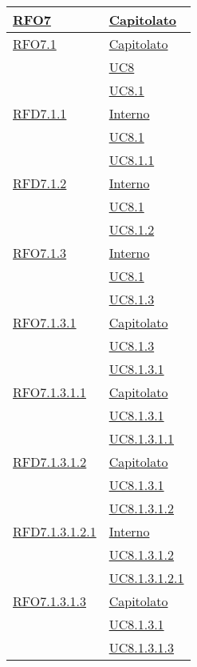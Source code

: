 \begin{longtable}{|>{\centering}m{5cm}|m{5cm}<{\centering}|}
\hyperlink{RFO7}{RFO7} & \hyperlink{Capitolato}{Capitolato}\\ \hline

\hyperlink{RFO7.1}{RFO7.1} & \hyperlink{Capitolato}{Capitolato}\\
& \hyperref[UC8]{UC8}\\
& \hyperref[UC8.1]{UC8.1}\\ \hline

\hyperlink{RFD7.1.1}{RFD7.1.1} & \hyperlink{Interno}{Interno}\\
& \hyperref[UC8.1]{UC8.1}\\
& \hyperref[UC8.1.1]{UC8.1.1}\\ \hline

\hyperlink{RFD7.1.2}{RFD7.1.2} & \hyperlink{Interno}{Interno}\\
& \hyperref[UC8.1]{UC8.1}\\
& \hyperref[UC8.1.2]{UC8.1.2}\\ \hline

\hyperlink{RFO7.1.3}{RFO7.1.3} & \hyperlink{Interno}{Interno}\\
& \hyperref[UC8.1]{UC8.1}\\
& \hyperref[UC8.1.3]{UC8.1.3}\\ \hline

\hyperlink{RFO7.1.3.1}{RFO7.1.3.1} & \hyperlink{Capitolato}{Capitolato}\\
& \hyperref[UC8.1.3]{UC8.1.3}\\
& \hyperref[UC8.1.3.1]{UC8.1.3.1}\\ \hline

\hyperlink{RFO7.1.3.1.1}{RFO7.1.3.1.1} & \hyperlink{Capitolato}{Capitolato}\\
& \hyperref[UC8.1.3.1]{UC8.1.3.1}\\
& \hyperref[UC8.1.3.1.1]{UC8.1.3.1.1}\\ \hline

\hyperlink{RFD7.1.3.1.2}{RFD7.1.3.1.2} & \hyperlink{Capitolato}{Capitolato}\\
& \hyperref[UC8.1.3.1]{UC8.1.3.1}\\
& \hyperref[UC8.1.3.1.2]{UC8.1.3.1.2}\\ \hline

\hyperlink{RFD7.1.3.1.2.1}{RFD7.1.3.1.2.1} & \hyperlink{Interno}{Interno}\\
& \hyperref[UC8.1.3.1.2]{UC8.1.3.1.2}\\
& \hyperref[UC8.1.3.1.2.1]{UC8.1.3.1.2.1}\\ \hline

\hyperlink{RFO7.1.3.1.3}{RFO7.1.3.1.3} & \hyperlink{Capitolato}{Capitolato}\\
& \hyperref[UC8.1.3.1]{UC8.1.3.1}\\
& \hyperref[UC8.1.3.1.3]{UC8.1.3.1.3}\\ \hline


\end{longtable}
